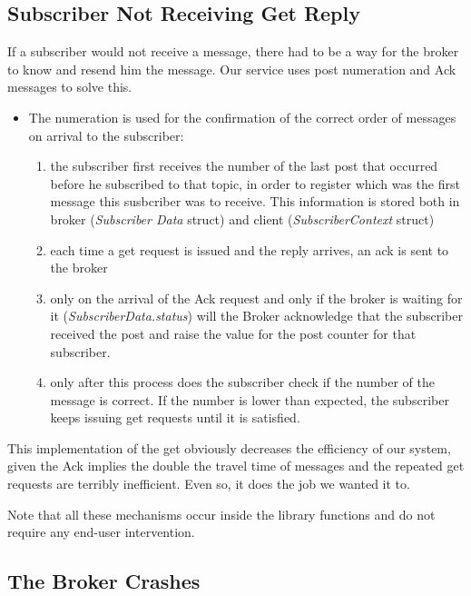 \subsection{Subscriber Not Receiving Get Reply}

If a subscriber would not receive a message, there had to be a way for the broker to know and resend him the message. Our service uses post numeration and Ack messages to solve this.

\begin{itemize}
    \item The numeration is used for the confirmation of the correct order of messages on arrival to the subscriber: 
    \begin{enumerate}
        \item  the subscriber first receives the number of the last post that occurred before he subscribed to that topic, in order to register which was the first message this susbcriber was to receive. This information is stored both in broker (\emph{Subscriber Data} struct) and client (\emph{SubscriberContext} struct)
        \item each time a get request is issued and the reply arrives, an ack is sent to the broker
        \item only on the arrival of the Ack request and only if the broker is waiting for it (\emph{SubscriberData.status}) will the Broker acknowledge that the subscriber received the post and raise the value for the post counter for that subscriber.
        \item only after this process does the subscriber check if the number of the message is correct. If the number is lower than expected, the subscriber keeps issuing get requests until it is satisfied.
    \end{enumerate}
\end{itemize}

This implementation of the get obviously decreases the efficiency of our system, given the Ack implies the double the travel time of messages and the repeated get requests are terribly inefficient. Even so, it does the job we wanted it to.

Note that all these mechanisms occur inside the library functions and do not require any end-user intervention.


\subsection{The Broker Crashes}

